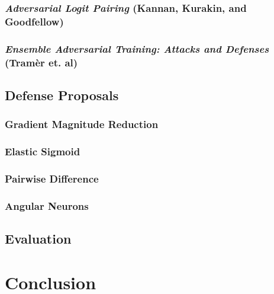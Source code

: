 \documentclass[showabstract,showacknowledgments,showpreface,showdedication]{iuphd}
\begin{document}
\subsection{\textit{Adversarial Logit Pairing} (Kannan, Kurakin, and Goodfellow)}

\subsection{\textit{Ensemble Adversarial Training: Attacks and Defenses} (Tramèr et. al)}


\section{Defense Proposals}

\subsection{Gradient Magnitude Reduction}
\label{gradientmagnitudereduction}


\subsection{Elastic Sigmoid}


\subsection{Pairwise Difference}


\subsection{Angular Neurons}
\label{cosineneurons}



\section{Evaluation}


\chapter*{Conclusion}


\end{document}
